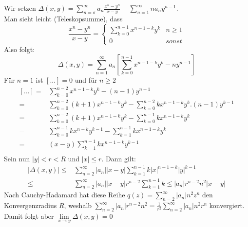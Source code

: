 \begin{Bemerkung}
{\begin{equation*}
	\end{equation*}
	Wir setzen $\Delta\left(x,y\right) = \sum_{n=\sigma}^{\infty} a_n 
	\frac{x^n - y^n}{x-y} - \sum_{n = 1}^{\infty}n a_n y^{n-1}$. \\
	Man sieht leicht (Teleskopsumme), dass
	\begin{equation*}
		\frac{x^n-y^n}{x-y} = \begin{cases}\sum_{k=0}^{n-1}x^{n-1-k}y^k & n \geq 1 
		\\ 0 & sonst \end{cases}
	\end{equation*}
	Also folgt: 
	\begin{equation*}
		\Delta\left(x,y\right) = \sum_{n=1}^{\infty} a_n \left[ \sum_{k=0}^{n-1} 
		x^{n-1-k}y^k -ny^{n-1}\right]
	\end{equation*}
	Für $n=1$ ist $\left[...\right] = 0$ und für $n\geq 2$
	\begin{align*}
		\left[...\right]  = & \sum_{k=0}^{n-2} x^{n-1-k}y^k - (n-1)y^{n-1} \\
		 = & \sum_{k=0}^{n-2} (k+1) x^{n-1-k}y^k - \sum_{k=0}^{n-2}kx^{n-1-k}y^k 
		.(n-1)y^{k-1} \\
		= & \sum_{k=0}^{n-2} (k+1) x^{n-1-k}y^k - \sum_{k=0}^{n-1}kx^{n-1-k}y^k \\
		= & \sum_{k=0}^{n-1} k x^{n-k} y^{k-1} - \sum_{k=1}^{n-1}kx^{n-1-k}y^k \\
		= &(x -y) \sum_{k=1}^{n-1}kx^{n-1-k}y^{k-1} \\
	\end{align*}
	Sein nun $\vert y\vert < r < R$ und $|x| \leq r$. Dann gilt:
	\begin{align*}
		\vert \Delta(x,y)\vert \leq & 
		\sum_{n=2}^{\infty} |a_n| |x-y| \sum_{k=1}^{n-1} 
		k|x|^{n-1-k}|y|^{k-1} \\
		\leq & \sum_{n=2}^{\infty} |a_n| |x-y|r^{n-2} \sum_{k=1}^{n-1}k 
		\leq |a_n|r^{n-2}n^2|x-y|
	\end{align*}
	Nach Cauchy-Hadamard hat diese Reihe $q(z) = \sum_{n=2}^{\infty} |a_n|n^2z^n$ 
	den Konvergenzradius $R$, weshalb $\sum_{n=2}^{\infty} |a_n| r^{n-2} n^2 
	= \frac{1}{r^2}\sum_{n=2}^{\infty} |a_n|n^2r^n$ konvergiert.
	Damit folgt aber $\lim\limits_{x \rightarrow y}{\Delta(x,y) = 0}$
}\end{Bemerkung}

